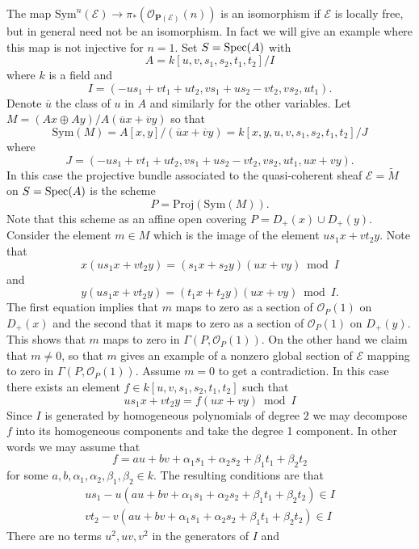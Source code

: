 \begin{example}
\label{example-projective-bundle}
The map $\text{Sym}^n(\mathcal{E}) \to
\pi_*(\mathcal{O}_{\mathbf{P}(\mathcal{E})}(n))$
is an isomorphism if $\mathcal{E}$ is locally free, but in general
need not be an isomorphism. In fact we will give an example where
this map is not injective for $n = 1$. Set $S = \mathop{\mathrm{Spec}}(A)$ with
$$
A = k[u, v, s_1, s_2, t_1, t_2]/I
$$
where $k$ is a field and
$$
I = (-us_1 + vt_1 + ut_2, vs_1 + us_2 - vt_2, vs_2, ut_1).
$$
Denote $\overline{u}$ the class of $u$ in $A$ and similarly for
the other variables.
Let $M = (Ax \oplus Ay)/A(\overline{u}x + \overline{v}y)$ so that
$$
\text{Sym}(M) = A[x, y]/(\overline{u}x + \overline{v}y)
= k[x, y, u, v, s_1, s_2, t_1, t_2]/J
$$
where
$$
J = (-us_1 + vt_1 + ut_2, vs_1 + us_2 - vt_2, vs_2, ut_1, ux + vy).
$$
In this case the projective bundle associated to the quasi-coherent
sheaf $\mathcal{E} = \widetilde{M}$ on $S = \mathop{\mathrm{Spec}}(A)$ is the scheme
$$
P =
\text{Proj}(\text{Sym}(M)).
$$
Note that this scheme as an affine open covering
$P = D_{+}(x) \cup D_{+}(y)$.
Consider the element
$m \in M$ which is the image of the element
$us_1x + vt_2y$. Note that
$$
x(us_1x + vt_2y) = (s_1x + s_2y)(ux + vy) \bmod I
$$
and
$$
y(us_1x + vt_2y) = (t_1x + t_2y)(ux + vy) \bmod I.
$$
The first equation implies that $m$ maps to zero as a
section of $\mathcal{O}_P(1)$ on $D_{+}(x)$ and the second
that it maps to zero as a section of $\mathcal{O}_P(1)$ on $D_{+}(y)$.
This shows that $m$ maps to zero in $\Gamma(P, \mathcal{O}_P(1))$.
On the other hand we claim that $m \not = 0$, so that $m$ gives
an example of a nonzero global section of $\mathcal{E}$ mapping to zero
in $\Gamma(P, \mathcal{O}_P(1))$. Assume $m = 0$
to get a contradiction. In this case there exists
an element $f \in k[u, v, s_1, s_2, t_1, t_2]$ such that
$$
us_1x + vt_2y = f(ux + vy) \bmod I
$$
Since $I$ is generated by homogeneous polynomials of degree $2$ we
may decompose $f$ into its homogeneous components and take the
degree 1 component. In other words we may assume that
$$
f = au + bv + \alpha_1s_1 + \alpha_2s_2 + \beta_1t_1 + \beta_2t_2
$$
for some $a, b, \alpha_1, \alpha_2, \beta_1, \beta_2 \in k$.
The resulting conditions are that
$$
\begin{matrix}
us_1 - u(au + bv + \alpha_1s_1 + \alpha_2s_2 + \beta_1t_1 + \beta_2t_2)
\in I \\
vt_2 - v(au + bv + \alpha_1s_1 + \alpha_2s_2 + \beta_1t_1 + \beta_2t_2)
\in I
\end{matrix}
$$
There are no terms $u^2, uv, v^2$ in the generators of $I$ and

\end{example}
